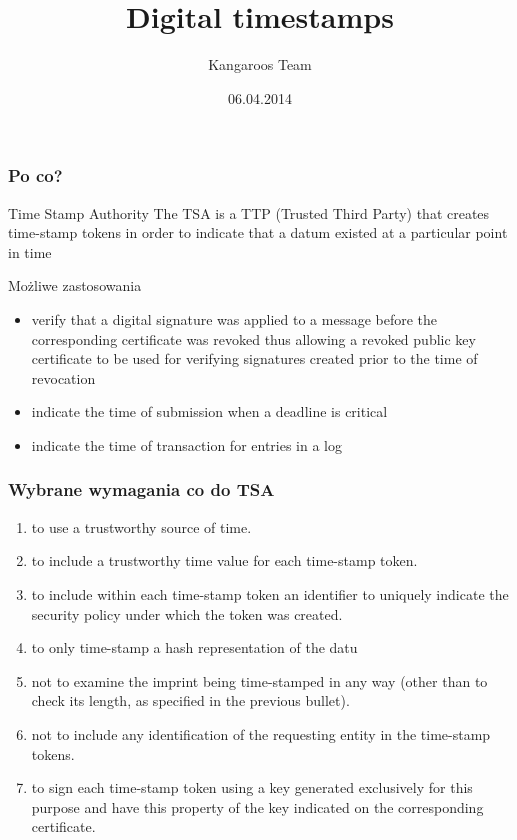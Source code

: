 \documentclass{beamer}
\title{Digital timestamps}
\author{Kangaroos Team}
\institute{APPSEC}
\date{06.04.2014}
\begin{document}
\begin{frame}
\titlepage
\end{frame}

\begin{frame}
	\frametitle{Po co?}
	\begin{block}{Time Stamp Authority}
   The TSA is a TTP (Trusted Third Party) that creates time-stamp tokens in order to indicate that a datum existed at a particular point in time
   \end{block}
	
	\begin{block}{Możliwe zastosowania}
		\begin{itemize}
			\item verify that a digital signature was
   applied to a message before the corresponding certificate was revoked
   thus allowing a revoked public key certificate to be used for
   verifying signatures created prior to the time of revocation
			\item indicate the time of submission when a deadline is
   critical
   			\item indicate the time of transaction for entries in a
   log
		\end{itemize}
	\end{block}
\end{frame}

\begin{frame}
	\frametitle{Wybrane wymagania co do TSA}
		\begin{enumerate}
			\item to use a trustworthy source of time.
			\item to include a trustworthy time value for each time-stamp token.
			\item to include within each time-stamp token an identifier to
         uniquely indicate the security policy under which the token was
         created.

   			\item to only time-stamp a hash representation of the datu
   			\item not to examine the imprint being time-stamped in any way (other than to check its length, as specified in the previous bullet).

   			\item not to include any identification of the requesting entity in the time-stamp tokens.

   			\item to sign each time-stamp token using a key generated exclusively for this purpose and have this property of the key indicated on  the corresponding certificate.
		\end{enumerate}
\end{frame}
\end{document}

